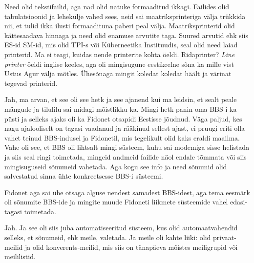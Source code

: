 
Need olid tekstifailid, aga nad olid natuke formaaditud ikkagi. Failides olid 
tabulatsioonid ja lehekülje vahed  sees, neid sai maatriksprinteriga välja 
trükkida nii, et tulid ikka ilusti formaadituna paberi peal välja. 
Maatriksprinterid olid kättesaadava hinnaga ja need olid enamuse arvutite taga. 
 Suured arvutid ehk siis ES-id SM-id, mis olid TPI-s või Küberneetika 
Instituudis, seal olid need laiad printerid. Ma ei teagi, kuidas nende 
printerite kohta öeldi. Ridaprinter? \emph{Line printer} öeldi inglise keeles, 
aga  oli mingisugune eestikeelne sõna ka mille vist Ustus Agur välja mõtles. Ühesõnaga mingit koledat koledat häält ja värinat tegevad 
printerid.


Jah, ma arvan, et see oli see hetk ja see ajanend kui ma leidsin, et sealt  
peale mängude ja  tilulilu sai midagi mõistlikku ka. Mingi hetk panin oma BBS-i 
ka püsti ja selleks ajaks oli ka Fidonet otsapidi Eestisse 
jõudnud. Väga paljud, kes nagu ajalooliselt on tagasi vaadanud ja rääkinud 
sellest ajast, ei pruugi eriti olla vahet teinud BBS-indusel ja Fidonetil,  mis 
tegelikult  olid kaks eraldi maailma. Vahe oli see, et BBS oli lihtsalt mingi 
süsteem, kuhu sai modemiga sisse helistada ja siis seal ringi toimetada,  
mingeid andmeid failide näol endale tõmmata või siis mingisuguseid sõnumeid 
vahetada. Aga kogu see info ja need sõnumid olid salvestatud sinna ühte 
konkreetsesse BBS-i süsteemi.

Fidonet aga sai ühe otsaga  alguse nendest samadest BBS-idest, aga tema eesmärk 
oli sõnumite BBS-ide ja mingite muude Fidoneti liikmete süsteemide vahel 
edasi-tagasi toimetada. 


Jah. Ja see oli siis juba automatiseeritud süsteem, kus olid automaatvahendid 
selleks, et sõnumeid, ehk  meile, valetada. Ja meile oli kahte liiki: olid 
privaat-meilid ja olid konverents-meilid, mis siis on tänapäeva mõistes 
meiligrupid või meililistid.

